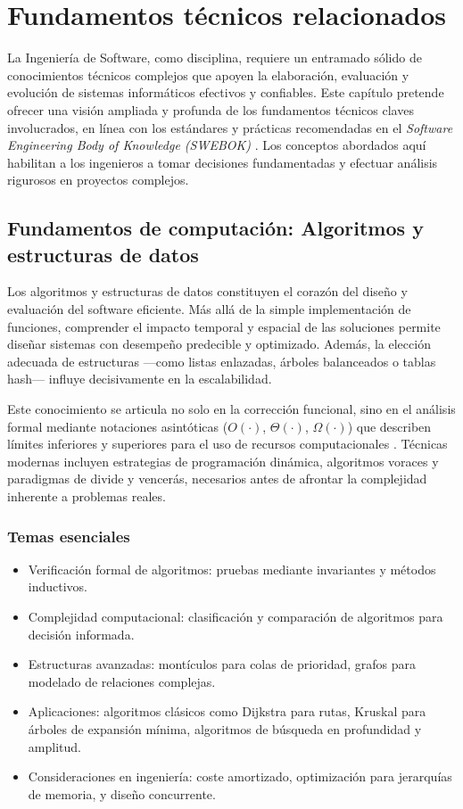 
\chapter{Fundamentos técnicos relacionados}
\label{chap:fundamentos}

La Ingeniería de Software, como disciplina, requiere un entramado sólido de conocimientos técnicos complejos que apoyen la elaboración, evaluación y evolución de sistemas informáticos efectivos y confiables. Este capítulo pretende ofrecer una visión ampliada y profunda de los fundamentos técnicos claves involucrados, en línea con los estándares y prácticas recomendadas en el \textit{Software Engineering Body of Knowledge (SWEBOK)} \parencite{swebok2024}. Los conceptos abordados aquí habilitan a los ingenieros a tomar decisiones fundamentadas y efectuar análisis rigurosos en proyectos complejos.

\section{Fundamentos de computación: Algoritmos y estructuras de datos}
Los algoritmos y estructuras de datos constituyen el corazón del diseño y evaluación del software eficiente. Más allá de la simple implementación de funciones, comprender el impacto temporal y espacial de las soluciones permite diseñar sistemas con desempeño predecible y optimizado. Además, la elección adecuada de estructuras —como listas enlazadas, árboles balanceados o tablas hash— influye decisivamente en la escalabilidad.

Este conocimiento se articula no solo en la corrección funcional, sino en el análisis formal mediante notaciones asintóticas ($O(\cdot)$, $\Theta(\cdot)$, $\Omega(\cdot)$) que describen límites inferiores y superiores para el uso de recursos computacionales \parencite{clrs2009,knuth1997}. Técnicas modernas incluyen estrategias de programación dinámica, algoritmos voraces y paradigmas de divide y vencerás, necesarios antes de afrontar la complejidad inherente a problemas reales.

\subsection*{Temas esenciales}
\begin{itemize}
  \item Verificación formal de algoritmos: pruebas mediante invariantes y métodos inductivos.
  \item Complejidad computacional: clasificación y comparación de algoritmos para decisión informada.
  \item Estructuras avanzadas: montículos para colas de prioridad, grafos para modelado de relaciones complejas.
  \item Aplicaciones: algoritmos clásicos como Dijkstra para rutas, Kruskal para árboles de expansión mínima, algoritmos de búsqueda en profundidad y amplitud.
  \item Consideraciones en ingeniería: coste amortizado, optimización para jerarquías de memoria, y diseño concurrente.
\end{itemize}


